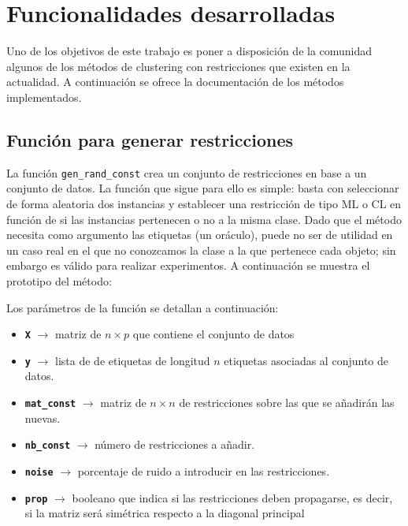 \section{Funcionalidades desarrolladas}

Uno de los objetivos de este trabajo es poner a disposición de la comunidad algunos de los métodos de clustering con restricciones que existen en la actualidad. A continuación se ofrece la documentación de los métodos implementados.

\subsection{Función para generar restricciones} \label{genConst}

La función \texttt{gen\_rand\_const} crea un conjunto de restricciones en base a un conjunto de datos. La función que sigue para ello es simple: basta con seleccionar de forma aleatoria dos instancias y establecer una restricción de tipo \acs{ML} o \acs{CL} en función de si las instancias pertenecen o no a la misma clase. Dado que el método necesita como argumento las etiquetas (un oráculo), puede no ser de utilidad en un caso real en el que no conozcamos la clase a la que pertenece cada objeto; sin embargo es válido para realizar experimentos. A continuación se muestra el prototipo del método:



Los parámetros de la función se detallan a continuación:

\begin{itemize}

	\item \textbf{\texttt{X}} {$\longrightarrow$ matriz de $n \times p$ que contiene el conjunto de datos}
	
	\item \textbf{\texttt{y}} {$\longrightarrow$ lista de de etiquetas de longitud $n$ etiquetas asociadas al conjunto de datos.}
	
	\item \textbf{\texttt{mat\_const}} {$\longrightarrow$ matriz de $n \times n$ de restricciones sobre las que se añadirán las nuevas.}
	
	\item \textbf{\texttt{nb\_const}} {$\longrightarrow$ número de restricciones a añadir.}
	
	\item \textbf{\texttt{noise}} {$\longrightarrow$ porcentaje de ruido a introducir en las restricciones.}
	
	\item \textbf{\texttt{prop}} {$\longrightarrow$ booleano que indica si las restricciones deben propagarse, es decir, si la matriz será simétrica respecto a la diagonal principal}

\end{itemize}

